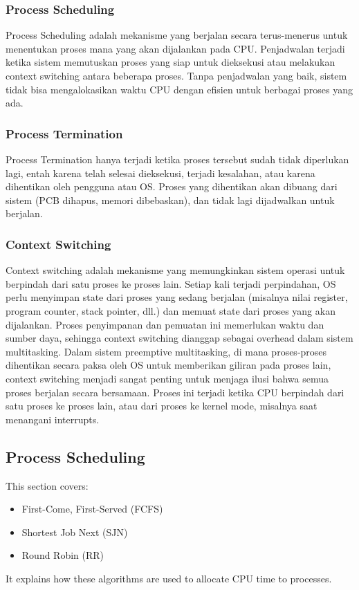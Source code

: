 \documentclass[12pt]{article}
\begin{document}
\subsubsection{Process Scheduling}
Process Scheduling adalah mekanisme yang berjalan secara terus-menerus untuk menentukan proses mana yang akan dijalankan pada CPU. Penjadwalan terjadi ketika sistem memutuskan proses yang siap untuk dieksekusi atau melakukan context switching antara beberapa proses. Tanpa penjadwalan yang baik, sistem tidak bisa mengalokasikan waktu CPU dengan efisien untuk berbagai proses yang ada.

\subsubsection{Process Termination}
Process Termination hanya terjadi ketika proses tersebut sudah tidak diperlukan lagi, entah karena telah selesai dieksekusi, terjadi kesalahan, atau karena dihentikan oleh pengguna atau OS. Proses yang dihentikan akan dibuang dari sistem (PCB dihapus, memori dibebaskan), dan tidak lagi dijadwalkan untuk berjalan.

\subsubsection{Context Switching}
Context switching adalah mekanisme yang memungkinkan sistem operasi untuk berpindah dari satu proses ke proses lain. Setiap kali terjadi perpindahan, OS perlu menyimpan state dari proses yang sedang berjalan (misalnya nilai register, program counter, stack pointer, dll.) dan memuat state dari proses yang akan dijalankan. Proses penyimpanan dan pemuatan ini memerlukan waktu dan sumber daya, sehingga context switching dianggap sebagai overhead dalam sistem multitasking. Dalam sistem preemptive multitasking, di mana proses-proses dihentikan secara paksa oleh OS untuk memberikan giliran pada proses lain, context switching menjadi sangat penting untuk menjaga ilusi bahwa semua proses berjalan secara bersamaan. Proses ini terjadi ketika CPU berpindah dari satu proses ke proses lain, atau dari proses ke kernel mode, misalnya saat menangani interrupts.

\subsection{Process Scheduling}
This section covers:
\begin{itemize}
    \item First-Come, First-Served (FCFS)
    \item Shortest Job Next (SJN)
    \item Round Robin (RR)
\end{itemize}
It explains how these algorithms are used to allocate CPU time to processes.
\end{document}
